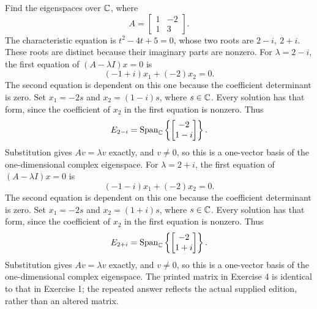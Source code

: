 \goal Find the eigenspaces over $\mathbb{C}$, where
\[A=\begin{bmatrix}1&-2\\1&3\end{bmatrix}.\]
The characteristic equation is $t^{2} - 4 t + 5=0$, whose two roots are $2 - i,\ 2 + i$. These roots are distinct because their imaginary parts are nonzero.
For $\lambda=2 - i$, the first equation of $(A-\lambda I)x=0$ is
\[(-1 + i)x_1+(-2)x_2=0.\]
The second equation is dependent on this one because the coefficient determinant is zero. Set $x_1=-2s$ and $x_2=(1 - i)s$, where $s\in\mathbb{C}$. Every solution has that form, since the coefficient of $x_2$ in the first equation is nonzero. Thus
\[E_{2 - i}=\operatorname{Span}_{\mathbb{C}}\left\{\begin{bmatrix}-2\\1 - i\end{bmatrix}\right\}.\]
Substitution gives $Av=\lambda v$ exactly, and $v\ne0$, so this is a one-vector basis of the one-dimensional complex eigenspace.
For $\lambda=2 + i$, the first equation of $(A-\lambda I)x=0$ is
\[(-1 - i)x_1+(-2)x_2=0.\]
The second equation is dependent on this one because the coefficient determinant is zero. Set $x_1=-2s$ and $x_2=(1 + i)s$, where $s\in\mathbb{C}$. Every solution has that form, since the coefficient of $x_2$ in the first equation is nonzero. Thus
\[E_{2 + i}=\operatorname{Span}_{\mathbb{C}}\left\{\begin{bmatrix}-2\\1 + i\end{bmatrix}\right\}.\]
Substitution gives $Av=\lambda v$ exactly, and $v\ne0$, so this is a one-vector basis of the one-dimensional complex eigenspace.
The printed matrix in Exercise 4 is identical to that in Exercise 1; the repeated answer reflects the actual supplied edition, rather than an altered matrix.

